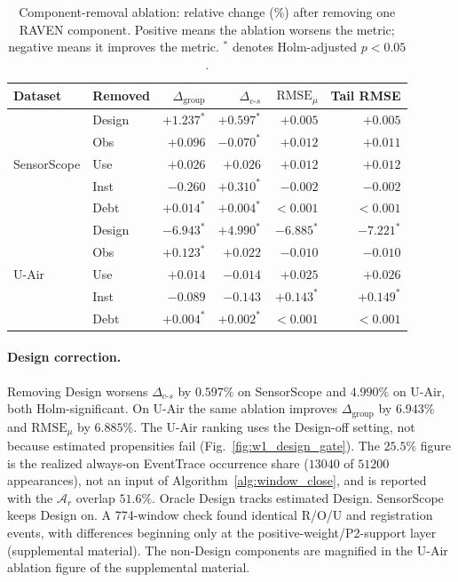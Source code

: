 \documentclass[letterpaper,journal]{IEEEtran}
\begin{document}
\begin{table}[!htbp]
\centering
\caption{Component-removal ablation: relative change (\%) after removing one RAVEN component.
Positive means the ablation worsens the metric; negative means it improves the
metric.  $^\ast$ denotes Holm-adjusted $p<0.05$.}
\label{tab:e4_ablation}
\setlength{\tabcolsep}{3.5pt}
\begin{tabular}{llrrrr}
\toprule
Dataset & Removed & $\Delta_{\mathrm{group}}$ &
$\Delta_{c\text{-}s}$ & $\mathrm{RMSE}_{\mu}$ & Tail RMSE\\
\midrule
\multirow{5}{*}{SensorScope}
& Design & $+1.237^\ast$ & $+0.597^\ast$ & $+0.005$ & $+0.005$\\
& Obs    & $+0.096$       & $-0.070^\ast$ & $+0.012$ & $+0.011$\\
& Use    & $+0.026$       & $+0.026$       & $+0.012$ & $+0.012$\\
& Inst   & $-0.260$       & $+0.310^\ast$ & $-0.002$ & $-0.002$\\
& Debt   & $+0.014^\ast$ & $+0.004^\ast$ & $<0.001$ & $<0.001$\\
\midrule
\multirow{5}{*}{U-Air}
& Design & $-6.943^\ast$ & $+4.990^\ast$ & $-6.885^\ast$ & $-7.221^\ast$\\
& Obs    & $+0.123^\ast$ & $+0.022$       & $-0.010$       & $-0.010$\\
& Use    & $+0.014$       & $-0.014$       & $+0.025$       & $+0.026$\\
& Inst   & $-0.089$       & $-0.143$       & $+0.143^\ast$ & $+0.149^\ast$\\
& Debt   & $+0.004^\ast$ & $+0.002^\ast$ & $<0.001$ & $<0.001$\\
\bottomrule
\end{tabular}
\end{table}

\paragraph{Design correction.}
Removing Design worsens $\Delta_{c\text{-}s}$ by $0.597\%$ on SensorScope and
$4.990\%$ on U-Air, both Holm-significant.  On U-Air the same ablation
improves $\Delta_{\mathrm{group}}$ by $6.943\%$ and
$\mathrm{RMSE}_{\mu}$ by $6.885\%$.  The U-Air ranking uses the Design-off
setting, not because estimated propensities fail
(Fig.~\ref{fig:w1_design_gate}).  The $25.5\%$ figure is the realized always-on
EventTrace occurrence share ($13040$ of $51200$ appearances), not an
input of Algorithm~\ref{alg:window_close}, and is reported with the $\mathcal{A}_r$ overlap
$51.6\%$.  Oracle Design tracks estimated
Design.  SensorScope keeps Design on.  A 774-window check found identical
R/O/U and registration events, with differences beginning only at the
positive-weight/P2-support layer
(supplemental material).
The non-Design components are magnified in the U-Air ablation figure of the supplemental material.
\end{document}
